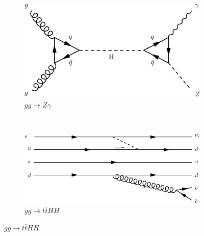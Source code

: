 \begin{figure}[h]
\begin{subfigure}[b]{0.3\textwidth}
  \end{subfigure}
  ~
  \begin{subfigure}[b]{0.3\textwidth}
    \includegraphics[width=\textwidth]{../dia/17.pdf}
    \caption{$gg \rightarrow Z\gamma$}
    \label{fey:17}
  \end{subfigure}%
  ~
  \begin{subfigure}[b]{0.3\textwidth}
    \includegraphics[width=\textwidth]{../dia/18.pdf}
    \caption{$gg\rightarrow t\bar{t}HH$}
    \label{fey:18}
  \end{subfigure}%
\end{figure}
\restoregeometry
